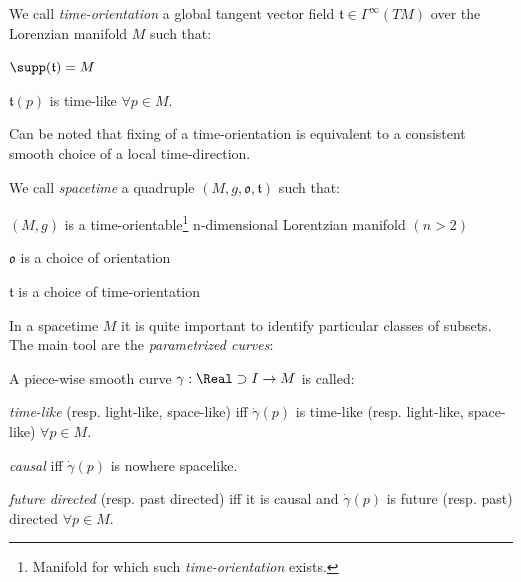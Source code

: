 \documentclass[Main]{subfiles}
\begin{document}
			\begin{definition}
				We call \emph{time-orientation} a global tangent vector field  $\mathfrak{t}\in \Gamma^\infty(TM)$ over the Lorenzian manifold $M$ 
				such that:
				\begin{compactitemize}
					\item $\supp(\mathfrak{t}) = M$
					\item $\mathfrak{t}(p)$ is time-like $\forall p \in M$.
				\end{compactitemize}
			\end{definition}
				Can be noted that fixing of a time-orientation is equivalent to a consistent smooth choice of a local time-direction.
	
			\begin{definition}[Spacetime]
				We call \emph{spacetime} a quadruple $(M, g, \mathfrak{o}, \mathfrak{t})$ such that:
				\begin{compactitemize}
					\item $(M,g)$ is a time-orientable\footnote{Manifold for which such \emph{time-orientation} exists.} n-dimensional Lorentzian manifold $(n>2)$
					\item $\mathfrak{o}$ is a choice of orientation
					\item $\mathfrak{t}$ is a choice of time-orientation
				\end{compactitemize}
			\end{definition}	
		
			In a spacetime $M$ it is quite important to identify particular classes of subsets. The main tool are the \emph{parametrized curves}:
			\begin{notationfix}

				A piece-wise smooth curve $\gamma: \Real\supset I \rightarrow M$ is called:
				\begin{compactitemize}
					\item \emph{time-like} (resp. light-like, space-like) iff $\dot{\gamma}(p)$ is time-like (resp. light-like, space-like) $\forall p \in M$.
					\item \emph{causal} iff $\dot{\gamma}(p)$ is nowhere spacelike.
					\item \emph{future directed} (resp. past directed) iff it is causal and  $\dot{\gamma}(p)$ is future (resp. past) directed $\forall p \in M$.
				\end{compactitemize}
			\end{notationfix}
\end{document}
